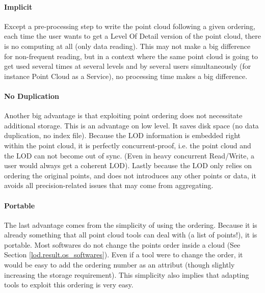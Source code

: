 			\paragraph{Implicit}
			Except a pre-processing step to write the point cloud following a given ordering, each time the user wants to get a Level Of Detail version of the point cloud, there is no computing at all (only data reading).
			This may not make a big difference for non-frequent reading, but in a context where the same point cloud is going to get used several times at several levels and by several users simultaneously (for instance Point Cloud as a Service), no processing time makes a big difference.
		
			\paragraph{No Duplication}
			Another big advantage is that exploiting point ordering does not necessitate additional storage.
			This is an advantage on low level. It saves disk space (no data duplication, no index file). Because the LOD information is embedded right within the point cloud, it is perfectly concurrent-proof, i.e. the point cloud and the LOD can not become out of sync.
			(Even in heavy concurrent Read/Write, a user would always get a coherent LOD).
			Lastly because the LOD only relies on ordering the original points, and does not introduces any other points or data, it avoids all precision-related issues that may come from aggregating.
			
			\paragraph{Portable}
			The last advantage comes from the simplicity of using the ordering. 
			Because it is already something that all point cloud tools can deal with (a list of points!), it is portable. Most softwares do not change the points order inside a cloud (See Section \ref{lod.result.os_softwares}).
			Even if a tool were to change the order, it would be easy to add the ordering number as an attribut (though slightly increasing the storage requirement).
			This simplicity also implies that adapting tools to exploit this ordering is very easy.
	
